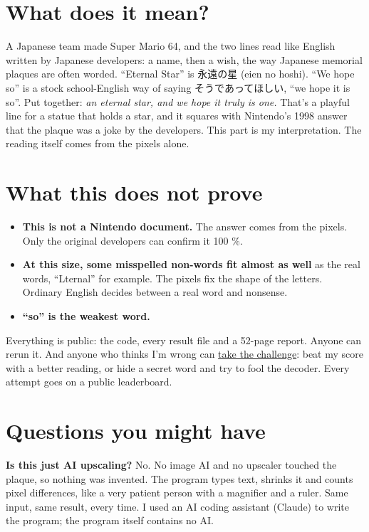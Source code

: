 \documentclass[11pt,a4paper]{article}
\begin{document}
\section*{What does it mean?}

A Japanese team made Super Mario 64, and the two lines read like English written by Japanese developers: a name, then a wish, the way Japanese memorial plaques are often worded. ``Eternal Star'' is 永遠の星 (eien no hoshi). ``We hope so'' is a stock school-English way of saying そうであってほしい, ``we hope it is so''. Put together: \emph{an eternal star, and we hope it truly is one.} That's a playful line for a statue that holds a star, and it squares with Nintendo's 1998 answer that the plaque was a joke by the developers. This part is my interpretation. The reading itself comes from the pixels alone.

\section*{What this does not prove}

\begin{itemize}
\item \textbf{This is not a Nintendo document.} The answer comes from the pixels. Only the original developers can confirm it 100 \%.
\item \textbf{At this size, some misspelled non-words fit almost as well} as the real words, ``Lternal'' for example. The pixels fix the shape of the letters. Ordinary English decides between a real word and nonsense.
\item \textbf{``so'' is the weakest word.}
\end{itemize}
Everything is public: the code, every result file and a 52-page report. Anyone can rerun it. And anyone who thinks I'm wrong can \href{https://github.com/supermochi64/sm64-plaque-decode/blob/main/CHALLENGE.md}{take the challenge}: beat my score with a better reading, or hide a secret word and try to fool the decoder. Every attempt goes on a public leaderboard.

\section*{Questions you might have}

\textbf{Is this just AI upscaling?} No. No image AI and no upscaler touched the plaque, so nothing was invented. The program types text, shrinks it and counts pixel differences, like a very patient person with a magnifier and a ruler. Same input, same result, every time. I used an AI coding assistant (Claude) to write the program; the program itself contains no AI.
\end{document}
